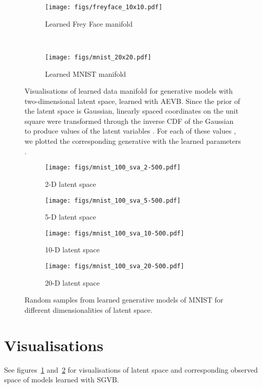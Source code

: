 \documentclass{article} \usepackage{nips13submit_e,times}
\theoremstyle{definition}
\theoremstyle{definition}
\begin{document}
\clearpage



 

\appendix
\begin{figure}[t]
	\centering
	\begin{subfigure}[t]{0.33\textwidth}
		\texttt{[image: figs/freyface\_10x10.pdf]}
		\caption{Learned Frey Face manifold}
	\end{subfigure}~ \begin{subfigure}[t]{0.57\textwidth}
		\texttt{[image: figs/mnist\_20x20.pdf]}
		\caption{Learned MNIST manifold}
	\end{subfigure}
	\caption{Visualisations of learned data manifold for generative models with two-dimensional latent space, learned with AEVB. Since the prior of the latent space is Gaussian, linearly spaced coordinates on the unit square were transformed through the inverse CDF of the Gaussian to produce values of the latent variables . For each of these values , we plotted the corresponding generative  with the learned parameters .}
\label{fig:2dmanifolds}
\end{figure}

\begin{figure}[h]
	\centering
	\begin{subfigure}[t]{0.23\textwidth}
		\texttt{[image: figs/mnist\_100\_sva\_2-500.pdf]}
		\caption{2-D latent space}
	\end{subfigure}
	\begin{subfigure}[t]{0.23\textwidth}
		\texttt{[image: figs/mnist\_100\_sva\_5-500.pdf]}
		\caption{5-D latent space}
	\end{subfigure}
	\begin{subfigure}[t]{0.23\textwidth}
		\texttt{[image: figs/mnist\_100\_sva\_10-500.pdf]}
		\caption{10-D latent space}
	\end{subfigure}
	\begin{subfigure}[t]{0.23\textwidth}
		\texttt{[image: figs/mnist\_100\_sva\_20-500.pdf]}
		\caption{20-D latent space}
	\end{subfigure}
	\caption{Random samples from learned generative models of MNIST for different dimensionalities of latent space.}
\label{fig:mnistsamples}
\end{figure}


\section{Visualisations}
\label{ap:visualisations}
See figures~\ref{fig:2dmanifolds} and~\ref{fig:mnistsamples} for visualisations of latent space and corresponding observed space of models learned with SGVB.
\end{document}
